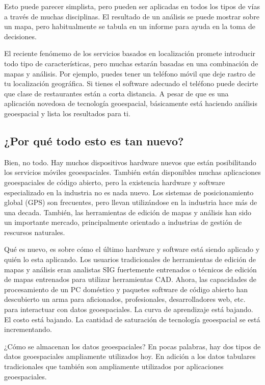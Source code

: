 Esto puede parecer simplista, pero pueden ser aplicadas en todos los tipos de
vías a través de muchas disciplinas. El resultado de un análisis se puede 
mostrar sobre un mapa, pero habitualmente se tabula en un informe para ayuda 
en la toma de decisiones.

El reciente fenómemo de los servicios basados en localización promete 
introducir todo tipo de características, pero muchas estarán basadas en una
combinación de mapas y análisis. Por ejemplo, puedes tener un teléfono móvil
que deje rastro de tu localización geográfica. Si tienes el software adecuado
el teléfono puede decirte que clase de restaurantes están a corta distancia. 
A pesar de que es una aplicación novedosa de tecnología geoespacial, 
básicamente está haciendo análisis geoespacial y lista los resultados para ti.

\subsection{¿Por qué todo esto es tan nuevo?}\label{label_whynew}

Bien, no todo. Hay muchos dispositivos hardware nuevos que están posibilitando
los servicios móviles geoespaciales. También están disponibles muchas 
aplicaciones geoespaciales de código abierto, pero la existencia hardware y 
software especializado en la industria no es nada nuevo.
Los sistemas de posicionamiento global (GPS) son frecuentes, pero llevan
utilizándose en la industria hace más de una decada. También, las herramientas
de edición de mapas y análisis han sido un importante mercado, principalmente 
orientado a industrias de gestión de rescursos naturales.

Qué es nuevo, es sobre cómo el último hardware y software está siendo aplicado
y quién lo esta aplicando. Los usuarios tradicionales de herramientas de 
edición de mapas y análisis eran analistas SIG fuertemente entrenados o 
técnicos de edición de mapas entrenados para utilizar herramientas CAD. 
Ahora, las capacidades de procesamiento de un PC doméstico y paquetes software 
de código abierto han descubierto un arma para aficionados, profesionales,
desarrolladores web, etc. para interactuar con datos geoespaciales. La curva 
de aprendizaje está bajando. El costo está bajando. La cantidad de saturación 
de tecnología geoespacial se está incrementando.

¿Cómo se almacenan los datos geoespaciales? En pocas palabras, hay dos tipos
de datos geoespaciales ampliamente utilizados hoy. En adición a los datos 
tabulares tradicionales que también son ampliamente utilizados por 
aplicaciones geoespaciales.

